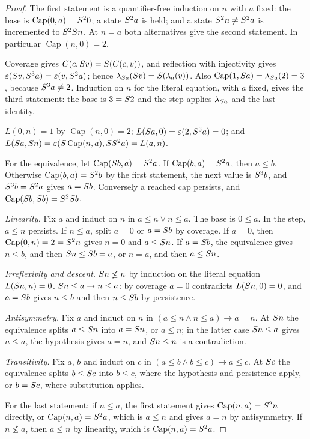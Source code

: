 \begin{proof}
The first statement is a quantifier-free induction on $n$ with $a$ fixed:
the base is $\operatorname{Cap}(0,a)=S^20$; a state $S^2a$ is held;
and a state $S^2n\neq S^2a$ is incremented to $S^2S n$. At $n=a$
both alternatives give the second statement. In particular
$\operatorname{Cap}(n,0)=2$.

Coverage gives $C(c,S v)=S(C(c,v))$, and reflection with injectivity
gives $\varepsilon(S v,S^3a)=\varepsilon(v,S^2a)$; hence
$\lambda_{S a}(S v)=S(\lambda_a(v))$. Also
$\operatorname{Cap}(1,S a)=\lambda_{S a}(2)=3$, because
$S^3a\neq2$. Induction on $n$ for the literal equation, with $a$ fixed,
gives the third statement: the base is $3=S 2$ and the step applies
$\lambda_{S a}$ and the last identity.

$L(0,n)=1$ by $\operatorname{Cap}(n,0)=2$; $L(S a,0)=\varepsilon(2,
S^3a)=0$; and
$L(S a,S n)=\varepsilon(S\operatorname{Cap}(n,a),SS^2a)
=L(a,n)$.

For the equivalence, let $\operatorname{Cap}(S b,a)=S^2a$. If
$\operatorname{Cap}(b,a)=S^2a$, then $a\leq b$. Otherwise
$\operatorname{Cap}(b,a)=S^2b$ by the first statement, the next value is
$S^3b$, and $S^3b=S^2a$ gives $a=S b$. Conversely a reached cap
persists, and $\operatorname{Cap}(S b,S b)=S^2S b$.

\emph{Linearity.} Fix $a$ and induct on $n$ in $a\leq n\lor n\leq a$. The
base is $0\leq a$. In the step, $a\leq n$ persists. If $n\leq a$, split
$a=0$ or $a=S b$ by coverage. If $a=0$, then
$\operatorname{Cap}(0,n)=2=S^2n$ gives $n=0$ and $a\leq S n$. If
$a=S b$, the equivalence gives $n\leq b$, and then
$S n\leq S b=a$, or $n=a$, and then $a\leq S n$.

\emph{Irreflexivity and descent.} $S n\not\leq n$ by induction on the
literal equation $L(S n,n)=0$. $S n\leq a\to n\leq a$: by coverage
$a=0$ contradicts $L(S n,0)=0$, and $a=S b$ gives $n\leq b$ and then
$n\leq S b$ by persistence.

\emph{Antisymmetry.} Fix $a$ and induct on $n$ in
$(a\leq n\land n\leq a)\to a=n$. At $S n$ the equivalence splits
$a\leq S n$ into $a=S n$, or $a\leq n$; in the latter case
$S n\leq a$ gives $n\leq a$, the hypothesis gives $a=n$, and
$S n\leq n$ is a contradiction.

\emph{Transitivity.} Fix $a$, $b$ and induct on $c$ in
$(a\leq b\land b\leq c)\to a\leq c$. At $S c$ the equivalence splits
$b\leq S c$ into $b\leq c$, where the hypothesis and persistence apply, or
$b=S c$, where substitution applies.

For the last statement: if $n\leq a$, the first statement gives
$\operatorname{Cap}(n,a)=S^2n$ directly, or
$\operatorname{Cap}(n,a)=S^2a$, which is $a\leq n$ and gives $a=n$ by
antisymmetry. If $n\not\leq a$, then $a\leq n$ by linearity, which is
$\operatorname{Cap}(n,a)=S^2a$.
\end{proof}

